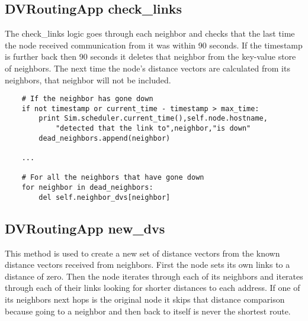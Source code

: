 \documentclass[11pt]{article}
\begin{document}
\vspace{5mm}

\subsection{DVRoutingApp check\_links}

The check\_links logic goes through each neighbor and checks that the last time the node received communication from it was within 90 seconds. If the timestamp is further back then 90 seconds it deletes that neighbor from the key-value store of neighbors. The next time the node's distance vectors are calculated from its neighbors, that neighbor will not be included.

\vspace{5mm}

\begin{lstlisting}
    # If the neighbor has gone down
    if not timestamp or current_time - timestamp > max_time:
        print Sim.scheduler.current_time(),self.node.hostname,
            "detected that the link to",neighbor,"is down"
        dead_neighbors.append(neighbor)

    ...

    # For all the neighbors that have gone down
    for neighbor in dead_neighbors:
        del self.neighbor_dvs[neighbor]
\end{lstlisting}

\vspace{5mm}


\subsection{DVRoutingApp new\_dvs}

This method is used to create a new set of distance vectors from the known distance vectors received from neighbors. First the node sets its own links to a distance of zero. Then the node iterates through each of its neighbors and iterates through each of their links looking for shorter distances to each address. If one of its neighbors next hops is the original node it skips that distance comparison because going to a neighbor and then back to itself is never the shortest route.

\vspace{5mm}
\end{document}
